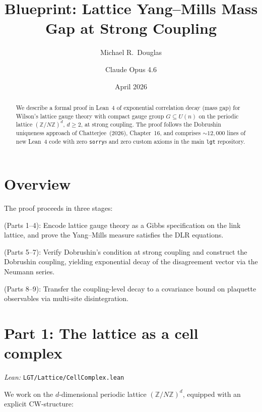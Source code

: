 \documentclass[11pt,a4paper]{article}
\title{Blueprint: Lattice Yang--Mills Mass Gap at Strong Coupling}
\author{Michael R.\ Douglas \and Claude Opus 4.6}
\date{April 2026}
\theoremstyle{definition}
\begin{document}
\maketitle

\begin{abstract}
We describe a formal proof in Lean~4 of exponential correlation
decay (mass gap) for Wilson's lattice gauge theory with compact
gauge group $G \subseteq U(n)$ on the periodic lattice
$(\mathbb{Z}/N\mathbb{Z})^d$, $d \geq 2$, at strong coupling.
The proof follows the Dobrushin uniqueness approach of
Chatterjee~(2026), Chapter~16, and comprises ${\sim}12{,}000$ lines of
new Lean~4 code with zero \texttt{sorry}s and zero custom axioms
in the main \texttt{lgt} repository.
\end{abstract}

\tableofcontents

\section{Overview}

The proof proceeds in three stages:

\begin{description}[leftmargin=2em]
\item[Stage A] (Parts 1--4): Encode lattice gauge theory as a
  Gibbs specification on the link lattice, and prove the
  Yang--Mills measure satisfies the DLR equations.
\item[Stage B] (Parts 5--7): Verify Dobrushin's condition at
  strong coupling and construct the Dobrushin coupling, yielding
  exponential decay of the disagreement vector via the Neumann
  series.
\item[Stage C] (Parts 8--9): Transfer the coupling-level decay
  to a covariance bound on plaquette observables via multi-site
  disintegration.
\end{description}

\section{Part 1: The lattice as a cell complex}

\textit{Lean:} \texttt{LGT/Lattice/CellComplex.lean}

\medskip

We work on the $d$-dimensional periodic lattice
$(\mathbb{Z}/N\mathbb{Z})^d$, equipped with an explicit
CW-structure:
\end{document}
